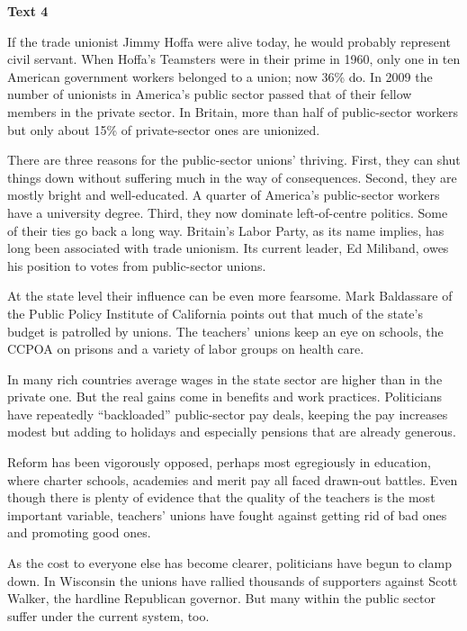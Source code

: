 
\begin{center}\textbf{Text 4}\end{center}

\qquad If the trade unionist Jimmy Hoffa were alive today, he would probably represent civil servant.
When Hoffa's Teamsters were in their prime in 1960, only one in ten American government workers
belonged to a union; now 36\% do. In 2009 the number of unionists in America's public sector 
passed that of their fellow members in the private sector. In Britain, more than half of public-sector 
workers but only about 15\% of private-sector ones are unionized.

\qquad There are three reasons for the public-sector unions' thriving. First, they can shut things down without suffering much in the way of consequences. Second, they are mostly bright and well-educated. A quarter of America's public-sector workers have a university degree. Third, they now dominate left-of-centre politics. Some of their ties go back a long way. Britain's Labor Party, as its name implies, has long been associated with trade unionism. Its current leader, Ed Miliband, owes his position to votes from public-sector unions.

\qquad At the state level their influence can be even more fearsome. Mark Baldassare of the Public Policy Institute of California points out that much of the state's budget is patrolled by unions. The teachers' unions keep an eye on schools, the CCPOA on prisons and a variety of labor groups on health care.

\qquad In many rich countries average wages in the state sector are higher than in the private one. But the real gains come in benefits and work practices. Politicians have repeatedly ``backloaded'' public-sector pay deals, keeping the pay increases modest but adding to holidays and especially pensions that are already generous.

\qquad Reform has been vigorously opposed, perhaps most egregiously in education, where charter schools, academies and merit pay all faced drawn-out battles. Even though there is plenty of evidence that the quality of the teachers is the most important variable, teachers' unions have fought against getting rid of bad ones and promoting good ones.

\qquad As the cost to everyone else has become clearer, politicians have begun to clamp down. In Wisconsin the unions have rallied thousands of supporters against Scott Walker, the hardline Republican governor. But many within the public sector suffer under the current system, too.

